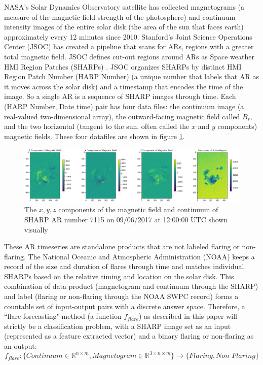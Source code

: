NASA's Solar Dynamics Observatory satellite has collected magnetograms (a measure of the magnetic field strength of the photosphere) and continuum intensity images of the entire solar disk (the area of the sun that faces earth) approximately every 12 minutes since 2010. Stanford's Joint Science Operations Center (JSOC) has created a pipeline that scans for ARs, regions with a greater total magnetic field. JSOC defines cut-out regions around ARs as Space weather HMI Region Patches (SHARPs) \cite{SHARP_Pipeline}. JSOC organizes SHARPs by distinct HMI Region Patch Number (HARP Number) (a unique number that labels that AR as it moves across the solar disk) and a timestamp that encodes the time of the image. So a single AR is a sequence of SHARP images through time. Each (HARP Number, Date time) pair has four data files: the continuum image (a real-valued two-dimensional array), the outward-facing magnetic field called $B_r$, and the two horizontal (tangent to the sun, often called the $x$ and $y$ components) magnetic fields. These four datafiles are shown in figure \ref{activeregionall}.
\begin{figure}[h]
\centering
\includegraphics[width=\linewidth]{ThesisFilePkg/figures/data/activeregionfull.png}
\caption{The $x, y, z$ components of the magnetic field and continuum of SHARP AR number 7115 on 09/06/2017 at 12:00:00 UTC shown visually}
\label{activeregionall}
\end{figure}

These AR timeseries are standalone products that are not labeled flaring or non-flaring. The National Oceanic and Atmospheric Administration (NOAA) keeps a record of the size and duration of flares through time and matches individual SHARPs based on the relative timing and location on the solar disk. This combination of data product (magnetogram and continuum through the SHARP) and label (flaring or non-flaring through the NOAA SWPC record) forms a countable set of input-output pairs with a discrete answer space. Therefore, a ``flare forecasting" method (a function $f_{flare}$) as described in this paper will strictly be a classification problem, with a SHARP image set as an input (represented as a feature extracted vector) and a binary flaring or non-flaring as an output:
$$f_{flare} : \{\textit{Continuum} \in \mathbb{R}^{n\times m}, \textit{Magnetogram} \in \mathbb{R}^{3\times n \times m}\} \rightarrow \{\textit{Flaring}, \textit{Non Flaring}\}$$

